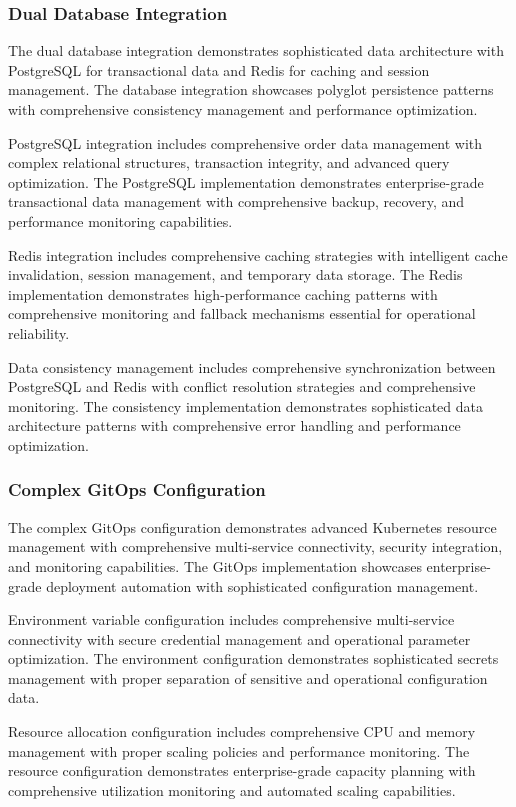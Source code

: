 \subsubsection{Dual Database Integration}

The dual database integration demonstrates sophisticated data architecture with PostgreSQL for transactional data and Redis for caching and session management. The database integration showcases polyglot persistence patterns with comprehensive consistency management and performance optimization.

PostgreSQL integration includes comprehensive order data management with complex relational structures, transaction integrity, and advanced query optimization. The PostgreSQL implementation demonstrates enterprise-grade transactional data management with comprehensive backup, recovery, and performance monitoring capabilities.

Redis integration includes comprehensive caching strategies with intelligent cache invalidation, session management, and temporary data storage. The Redis implementation demonstrates high-performance caching patterns with comprehensive monitoring and fallback mechanisms essential for operational reliability.

Data consistency management includes comprehensive synchronization between PostgreSQL and Redis with conflict resolution strategies and comprehensive monitoring. The consistency implementation demonstrates sophisticated data architecture patterns with comprehensive error handling and performance optimization.

\subsubsection{Complex GitOps Configuration}

The complex GitOps configuration demonstrates advanced Kubernetes resource management with comprehensive multi-service connectivity, security integration, and monitoring capabilities. The GitOps implementation showcases enterprise-grade deployment automation with sophisticated configuration management.

Environment variable configuration includes comprehensive multi-service connectivity with secure credential management and operational parameter optimization. The environment configuration demonstrates sophisticated secrets management with proper separation of sensitive and operational configuration data.

Resource allocation configuration includes comprehensive CPU and memory management with proper scaling policies and performance monitoring. The resource configuration demonstrates enterprise-grade capacity planning with comprehensive utilization monitoring and automated scaling capabilities.

